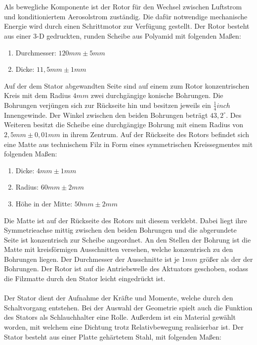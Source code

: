 \\\\
Als bewegliche Komponente ist der Rotor f\"{u}r den Wechsel zwischen Luftstrom und konditioniertem Aerosolstrom zust\"{a}ndig. Die daf\"{u}r notwendige mechanische Energie wird durch einen Schrittmotor zur Verf\"{u}gung gestellt. Der Rotor besteht aus einer 3-D gedruckten, runden Scheibe aus Polyamid mit folgenden Ma{\ss}en:
\begin{enumerate}
	\item Durchmesser: \(120 mm \pm 5 mm\)
	\item Dicke: \(11,5 mm \pm 1 mm\)
\end{enumerate}
Auf der dem Stator abgewandten Seite sind auf einem zum Rotor konzentrischen Kreis mit dem Radius \(4 mm\) zwei durchg\"{a}ngige konische Bohrungen. Die Bohrungen verj\"{u}ngen sich zur R\"{u}ckseite hin und besitzen jeweils ein \(\frac{1}{4} inch\) Innengewinde. Der Winkel zwischen den beiden Bohrungen betr\"{a}gt \(43,2^\circ\). Des Weiteren besitzt die Scheibe eine durchg\"{a}ngige Bohrung mit einem Radius von \(2,5 mm \pm 0,01 mm\) in ihrem Zentrum. Auf der R\"{u}ckseite des Rotors befindet sich eine Matte aus technischem Filz in Form eines symmetrischen Kreissegmentes mit folgenden Ma{\ss}en:
\newpage
\begin{enumerate}
	\item Dicke: \(4 mm \pm 1mm\)
	\item Radius: \(60 mm \pm 2 mm\)
	\item H\"{o}he in der Mitte: \(50 mm \pm 2 mm\)
\end{enumerate}
Die Matte ist auf der R\"{u}ckseite des Rotors mit diesem verklebt. Dabei liegt ihre Symmetrieachse mittig zwischen den beiden Bohrungen und die abgerundete Seite ist konzentrisch zur Scheibe angeordnet. An den Stellen der Bohrung ist die Matte mit kreisf\"{o}rmigen Ausschnitten versehen, welche konzentrisch zu den Bohrungen liegen. Der Durchmesser der Ausschnitte ist je \(1 mm\) gr\"{o}{\ss}er als der der Bohrungen. Der Rotor ist auf die Antriebswelle des Aktuators geschoben, sodass die Filzmatte durch den Stator leicht eingedr\"{u}ckt ist.
\\\\
Der Stator dient der Aufnahme der Kr\"{a}fte und Momente, welche durch den Schaltvorgang entstehen. Bei der Auswahl der Geometrie spielt auch die Funktion des Stators als Schlauchhalter eine Rolle. Au{\ss}erdem ist ein Material gew\"{a}hlt worden, mit welchem eine Dichtung trotz Relativbewegung realisierbar ist. Der Stator besteht aus einer Platte geh\"{a}rtetem Stahl, mit folgenden Ma{\ss}en:
